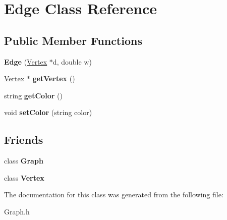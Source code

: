 \hypertarget{class_edge}{\section{Edge Class Reference}
\label{class_edge}
}
\subsection*{Public Member Functions}
\begin{DoxyCompactItemize}
\item 
\hypertarget{class_edge_a041d500f644a54f195d4d1bc56787cac}{{\bfseries Edge} (\hyperlink{class_vertex}{Vertex} $\ast$d, double w)}\label{class_edge_a041d500f644a54f195d4d1bc56787cac}

\item 
\hypertarget{class_edge_a132271fc674158c6c47b8763b54ee443}{\hyperlink{class_vertex}{Vertex} $\ast$ {\bfseries get\-Vertex} ()}\label{class_edge_a132271fc674158c6c47b8763b54ee443}

\item 
\hypertarget{class_edge_a6501f95cc0ffe78c89f0d17ff793b2e4}{string {\bfseries get\-Color} ()}\label{class_edge_a6501f95cc0ffe78c89f0d17ff793b2e4}

\item 
\hypertarget{class_edge_a19efe1e6564d558ec22eb811449d063c}{void {\bfseries set\-Color} (string color)}\label{class_edge_a19efe1e6564d558ec22eb811449d063c}

\end{DoxyCompactItemize}
\subsection*{Friends}
\begin{DoxyCompactItemize}
\item 
\hypertarget{class_edge_afab89afd724f1b07b1aaad6bdc61c47a}{class {\bfseries Graph}}\label{class_edge_afab89afd724f1b07b1aaad6bdc61c47a}

\item 
\hypertarget{class_edge_a1251d18f08324022e8e73506c3768f3c}{class {\bfseries Vertex}}\label{class_edge_a1251d18f08324022e8e73506c3768f3c}

\end{DoxyCompactItemize}


The documentation for this class was generated from the following file\-:\begin{DoxyCompactItemize}
\item 
Graph.\-h\end{DoxyCompactItemize}
